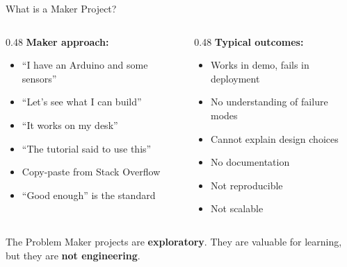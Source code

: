 \documentclass[aspectratio=169,11pt]{beamer}
\begin{document}
\begin{frame}{What is a Maker Project?}
    \begin{columns}[T]
        \begin{column}{0.48\textwidth}
            \textbf{Maker approach:}
            \begin{itemize}
                \item ``I have an Arduino and some sensors''
                \item ``Let's see what I can build''
                \item ``It works on my desk''
                \item ``The tutorial said to use this''
                \item Copy-paste from Stack Overflow
                \item ``Good enough'' is the standard
            \end{itemize}
        \end{column}
        \begin{column}{0.48\textwidth}
            \textbf{Typical outcomes:}
            \begin{itemize}
                \item Works in demo, fails in deployment
                \item No understanding of failure modes
                \item Cannot explain design choices
                \item No documentation
                \item Not reproducible
                \item Not scalable
            \end{itemize}
        \end{column}
    \end{columns}
    
    \vspace{0.3cm}
    \begin{block}{The Problem}
        Maker projects are \textbf{exploratory}. They are valuable for learning, but they are \textbf{not engineering}.
    \end{block}
\end{frame}
\end{document}
